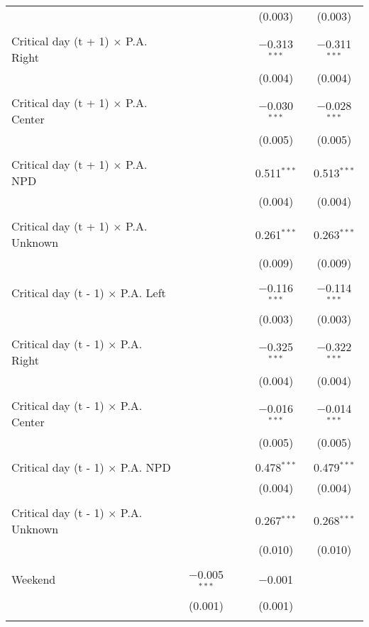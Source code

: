 \documentclass[
]{article}
\begin{document}
\begin{table}[!htbp]
{\begin{tabular}{@{\extracolsep{5pt}}lcccc}
  &  &  & (0.003) & (0.003) \\ 
  & & & & \\ 
 Critical day (t + 1) $\times$ P.A. Right &  &  & $-$0.313$^{***}$ & $-$0.311$^{***}$ \\ 
  &  &  & (0.004) & (0.004) \\ 
  & & & & \\ 
 Critical day (t + 1) $\times$ P.A. Center &  &  & $-$0.030$^{***}$ & $-$0.028$^{***}$ \\ 
  &  &  & (0.005) & (0.005) \\ 
  & & & & \\ 
 Critical day (t + 1) $\times$ P.A. NPD &  &  & 0.511$^{***}$ & 0.513$^{***}$ \\ 
  &  &  & (0.004) & (0.004) \\ 
  & & & & \\ 
 Critical day (t + 1) $\times$ P.A. Unknown &  &  & 0.261$^{***}$ & 0.263$^{***}$ \\ 
  &  &  & (0.009) & (0.009) \\ 
  & & & & \\ 
 Critical day (t - 1) $\times$ P.A. Left &  &  & $-$0.116$^{***}$ & $-$0.114$^{***}$ \\ 
  &  &  & (0.003) & (0.003) \\ 
  & & & & \\ 
 Critical day (t - 1) $\times$ P.A. Right &  &  & $-$0.325$^{***}$ & $-$0.322$^{***}$ \\ 
  &  &  & (0.004) & (0.004) \\ 
  & & & & \\ 
 Critical day (t - 1) $\times$ P.A. Center &  &  & $-$0.016$^{***}$ & $-$0.014$^{***}$ \\ 
  &  &  & (0.005) & (0.005) \\ 
  & & & & \\ 
 Critical day (t - 1) $\times$ P.A. NPD &  &  & 0.478$^{***}$ & 0.479$^{***}$ \\ 
  &  &  & (0.004) & (0.004) \\ 
  & & & & \\ 
 Critical day (t - 1) $\times$ P.A. Unknown &  &  & 0.267$^{***}$ & 0.268$^{***}$ \\ 
  &  &  & (0.010) & (0.010) \\ 
  & & & & \\ 
 Weekend & $-$0.005$^{***}$ &  & $-$0.001 &  \\ 
  & (0.001) &  & (0.001) &  \\ 
  & & & & \\ 

\end{tabular}}
\end{table}
\end{document}
